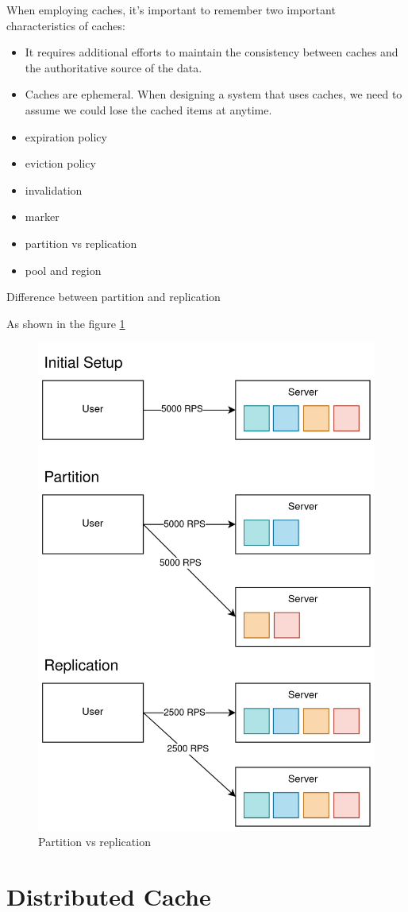 \documentclass[letterpaper, oneside]{book}
\theoremstyle{definition}
\theoremstyle{remark}
\begin{document}
When employing caches, it's important to remember two important characteristics of caches:
\begin{itemize}
    \item It requires additional efforts to maintain the consistency between caches and the authoritative source of the data.
    \item Caches are ephemeral. When designing a system that uses caches, we need to assume we could lose the cached items at anytime.
\end{itemize}


\begin{itemize}
    \item expiration policy
    \item eviction policy
    \item invalidation
    \item marker
    \item partition vs replication
    \item pool and region
\end{itemize}


Difference between partition and replication

As shown in the figure \ref{fig:partition_vs_replication}

\begin{figure}[h]
    \centering
    \includegraphics[height=0.60\textwidth]{partition_vs_replication.png}
    \caption{Partition vs replication}
    \label{fig:partition_vs_replication}
\end{figure}


\section{Distributed Cache}
\end{document}
